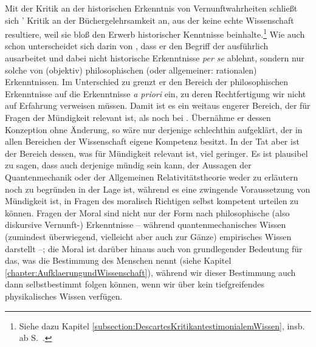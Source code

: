 Mit der Kritik an der historischen Erkenntnis von
Vernunftwahrheiten schließt sich 
' Kritik an der
Büchergelehrsamkeit an, aus der keine echte Wissenschaft resultiere, weil sie
bloß den Erwerb historischer Kenntnisse beinhalte.\footnote{Siehe dazu Kapitel
\ref{subsection:DescartesKritikantestimonialemWissen}, insb. ab
S.~\pageref{Abschnitt:DescartesundhistorischeKenntnisse}.} Wie auch schon
unterscheidet sich  darin von
, dass er den Begriff
der  ausführlich ausarbeitet und dabei
nicht historische Erkenntnisse \emph{per se} ablehnt, sondern nur solche von
(objektiv) philosophischen (oder allgemeiner: rationalen)
Erkenntnissen. Im Unterschied zu
 grenzt er
den Bereich der philosophischen Erkenntnisse auf die Erkenntnisse \emph{a
priori} ein, zu deren Rechtfertigung wir nicht auf Erfahrung verweisen müssen.
Damit ist es ein weitaus engerer Bereich, der für Fragen der Mündigkeit
relevant ist, als noch bei .
Übernähme er dessen Konzeption ohne Änderung, so wäre nur derjenige schlechthin
aufgeklärt, der in allen Bereichen der Wissenschaft eigene Kompetenz besitzt. In der Tat aber ist der
Bereich dessen, was für Mündigkeit relevant ist, viel geringer. Es ist
plausibel zu sagen, dass auch derjenige mündig sein kann, der Aussagen der
Quantenmechanik oder der Allgemeinen Relativitätstheorie weder zu erläutern noch
zu begründen in der Lage ist, während es eine zwingende Voraussetzung von
Mündigkeit ist, in Fragen des moralisch Richtigen selbst kompetent urteilen zu
können. Fragen der Moral sind nicht nur der Form nach philosophische (also
diskursive Vernunft-) Erkenntnisse -- während quantenmechanisches Wissen
(zumindest überwiegend, vielleicht aber auch zur Gänze) empirisches Wissen
darstellt --; die Moral ist darüber hinaus auch von grundlegender Bedeutung für
das, was  die Bestimmung des Menschen nennt (siehe Kapitel
\ref{chapter:AufklaerungundWissenschaft}), während wir dieser Bestimmung auch
dann selbstbestimmt folgen können, wenn wir über kein tiefgreifendes
physikalisches Wissen verfügen.


